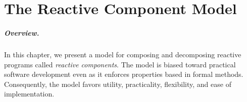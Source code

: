 \chapter{The Reactive Component Model \label{model}}

\paragraph{Overview.}
In this chapter, we present a model for composing and decomposing reactive programs called \emph{reactive components}.
The model is biased toward practical software development even as it enforces properties based in formal methods.
Consequently, the model favors utility, practicality, flexibility, and ease of implementation.



